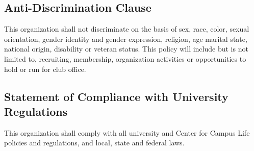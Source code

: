 \documentclass{article}
\newcommand{\asection}[1]{\subsection{#1} \label{#1}}
\begin{document}
\asection{Anti-Discrimination Clause}
This organization shall not discriminate on the basis of sex, race, color, sexual orientation, gender identity and gender expression, religion, age marital state, national origin, disability or veteran status.
This policy will include but is not limited to, recruiting, membership, organization activities or opportunities to hold or run for club office.

\asection{Statement of Compliance with University Regulations}
This organization shall comply with all university and Center for Campus Life policies and regulations, and local, state and federal laws.
\end{document}
